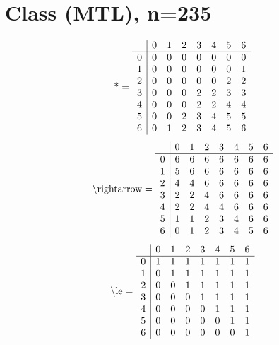 \documentclass[11pt]{article}
\begin{document}
\section{Class (MTL), n=235}
\[\text{*} = 
\begin{array}{r | r r r r r r r}
 & 0 & 1 & 2 & 3 & 4 & 5 & 6 \\ \hline
0 & 0 & 0 & 0 & 0 & 0 & 0 & 0 \\
1 & 0 & 0 & 0 & 0 & 0 & 0 & 1 \\
2 & 0 & 0 & 0 & 0 & 0 & 2 & 2 \\
3 & 0 & 0 & 0 & 2 & 2 & 3 & 3 \\
4 & 0 & 0 & 0 & 2 & 2 & 4 & 4 \\
5 & 0 & 0 & 2 & 3 & 4 & 5 & 5 \\
6 & 0 & 1 & 2 & 3 & 4 & 5 & 6 \\
\end{array}
\]
\[\text{\textbackslash rightarrow} = 
\begin{array}{r | r r r r r r r}
 & 0 & 1 & 2 & 3 & 4 & 5 & 6 \\ \hline
0 & 6 & 6 & 6 & 6 & 6 & 6 & 6 \\
1 & 5 & 6 & 6 & 6 & 6 & 6 & 6 \\
2 & 4 & 4 & 6 & 6 & 6 & 6 & 6 \\
3 & 2 & 2 & 4 & 6 & 6 & 6 & 6 \\
4 & 2 & 2 & 4 & 4 & 6 & 6 & 6 \\
5 & 1 & 1 & 2 & 3 & 4 & 6 & 6 \\
6 & 0 & 1 & 2 & 3 & 4 & 5 & 6 \\
\end{array}
\]
\[\text{\textbackslash le} = 
\begin{array}{r | r r r r r r r}
 & 0 & 1 & 2 & 3 & 4 & 5 & 6 \\ \hline
0 & 1 & 1 & 1 & 1 & 1 & 1 & 1 \\
1 & 0 & 1 & 1 & 1 & 1 & 1 & 1 \\
2 & 0 & 0 & 1 & 1 & 1 & 1 & 1 \\
3 & 0 & 0 & 0 & 1 & 1 & 1 & 1 \\
4 & 0 & 0 & 0 & 0 & 1 & 1 & 1 \\
5 & 0 & 0 & 0 & 0 & 0 & 1 & 1 \\
6 & 0 & 0 & 0 & 0 & 0 & 0 & 1 \\
\end{array}
\]
\end{document}
